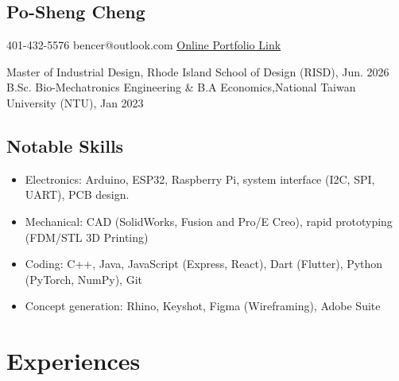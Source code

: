 \documentclass[12pt]{article}
\begin{document}
\begin{multicols}{2}
    \section*{Po-Sheng Cheng}
    401-432-5576 \newline
    bencer@outlook.com \newline
    \href{https://bencer3283.github.io/art/}{\underline{Online Portfolio Link}}
    
    \columnbreak
    {\sffamily \small \noindent
    Master of Industrial Design, Rhode Island School of Design (RISD), Jun. 2026 \newline \newline
    B.Sc. Bio-Mechatronics Engineering \& B.A Economics,\newline National Taiwan University (NTU), Jan 2023
    }
\end{multicols}
\subsection*{Notable Skills}
{ \small \begin{itemize}
    \item Electronics: Arduino, ESP32, Raspberry Pi, system interface (I2C, SPI, UART), PCB design.
    \item Mechanical: CAD (SolidWorks, Fusion and Pro/E Creo), rapid prototyping (FDM/STL 3D Printing)
    \item Coding: C++, Java, JavaScript (Express, React), Dart (Flutter), Python (PyTorch, NumPy), Git
    \item Concept generation: Rhino, Keyshot, Figma (Wireframing), Adobe Suite
\end{itemize}}
    \section*{Experiences}
\end{document}
